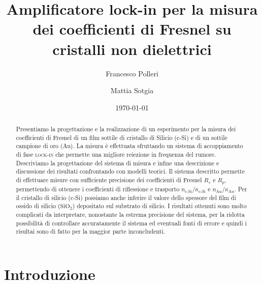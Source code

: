 \documentclass[
    prb,altaffilletter,citeautoscript,
    amsmath,amssymb,
    showpacs,showkeys,floatfix,
    reprint
]{revtex4-1}
\begin{document}
\title{Amplificatore lock-in per la misura dei coefficienti di Fresnel su cristalli non dielettrici}

\author{Francesco Polleri}

\author{Mattia Sotgia}

\date{\today}

\begin{abstract}
    Presentiamo la progettazione e la realizzazione di un esperimento per la misura dei coefficienti di Fresnel di un film sottile di cristallo di Silicio (c-Si) e di un sottile campione di oro (Au). La misura è effettuata sfruttando un sistema di accoppiamento di fase \textsc{lock-in}\cite{scofieldFrequencydomainDescriptionLockin1994} che permette una migliore reiezione in frequenza del rumore. Descriviamo la progettazione del sistema di misura e infine una descrizione e discussione dei risultati confrontando con modelli teorici. Il sistema descritto permette di effettuare misure con sufficiente precisione dei coefficienti di Fresnel $R_s$ e $R_p$, permettendo di ottenere i coefficienti di riflessione e trasporto $n_\text{c-Si}/\kappa_\text{c-Si}$ e $n_\text{Au}/\kappa_\text{Au}$. Per il cristallo di silicio (c-Si) possiamo anche inferire il valore dello spessore del film di ossido di silicio ($\mathrm{SiO_2}$) depositato sul substrato di silicio. I risultati ottenuti sono molto complicati da interpretare, nonostante la estrema precisione del sistema, per la ridotta possibilità di controllare accuratamente il sistema ed eventuali fonti di errore e quindi i risultai sono di fatto per la maggior parte inconcludenti.
\end{abstract}
\maketitle

\let\tocname\relax
\tableofcontents

\section{Introduzione} 
\end{document}
